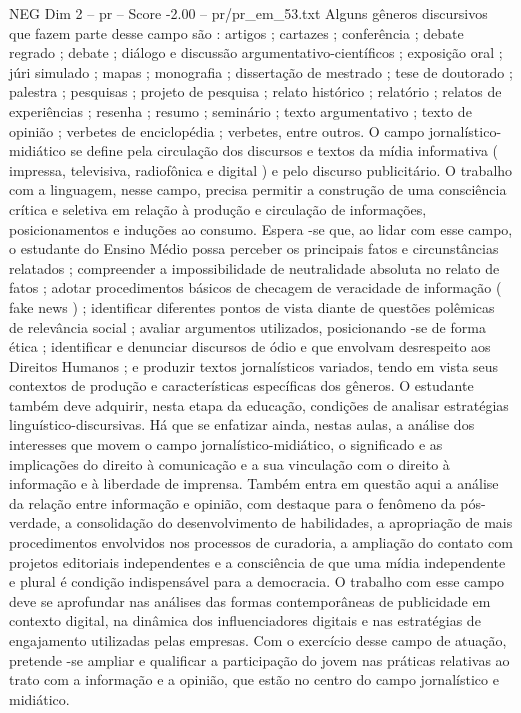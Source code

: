\begin{textsample}{NEG Dim 2 – pr – Score -2.00 – pr/pr\_em\_53.txt}
Alguns gêneros discursivos que fazem parte desse campo são : artigos ; cartazes ; conferência ; debate regrado ; debate ; diálogo e discussão argumentativo-científicos ; exposição oral ; júri simulado ; mapas ; monografia ; dissertação de mestrado ; tese de doutorado ; palestra ; pesquisas ; projeto de pesquisa ; relato histórico ; relatório ; relatos de experiências ; resenha ; resumo ; seminário ; texto argumentativo ; texto de opinião ; verbetes de enciclopédia ; verbetes, entre outros.
O campo jornalístico-midiático se define pela circulação dos discursos e textos da mídia informativa ( impressa, televisiva, radiofônica e digital ) e pelo discurso publicitário.
O trabalho com a linguagem, nesse campo, precisa permitir a construção de uma consciência crítica e seletiva em relação à produção e circulação de informações, posicionamentos e induções ao consumo.
Espera -se que, ao lidar com esse campo, o estudante do Ensino Médio possa perceber os principais fatos e circunstâncias relatados ; compreender a impossibilidade de neutralidade absoluta no relato de fatos ; adotar procedimentos básicos de checagem de veracidade de informação ( fake news ) ; identificar diferentes pontos de vista diante de questões polêmicas de relevância social ; avaliar argumentos utilizados, posicionando -se de forma ética ; identificar e denunciar discursos de ódio e que envolvam desrespeito aos Direitos Humanos ; e produzir textos jornalísticos variados, tendo em vista seus contextos de produção e características específicas dos gêneros.
O estudante também deve adquirir, nesta etapa da educação, condições de analisar estratégias linguístico-discursivas.
Há que se enfatizar ainda, nestas aulas, a análise dos interesses que movem o campo jornalístico-midiático, o significado e as implicações do direito à comunicação e a sua vinculação com o direito à informação e à liberdade de imprensa.
Também entra em questão aqui a análise da relação entre informação e opinião, com destaque para o fenômeno da pós-verdade, a consolidação do desenvolvimento de habilidades, a apropriação de mais procedimentos envolvidos nos processos de curadoria, a ampliação do contato com projetos editoriais independentes e a consciência de que uma mídia independente e plural é condição indispensável para a democracia.
O trabalho com esse campo deve se aprofundar nas análises das formas contemporâneas de publicidade em contexto digital, na dinâmica dos influenciadores digitais e nas estratégias de engajamento utilizadas pelas empresas.
Com o exercício desse campo de atuação, pretende -se ampliar e qualificar a participação do jovem nas práticas relativas ao trato com a informação e a opinião, que estão no centro do campo jornalístico e midiático.

\end{textsample}
